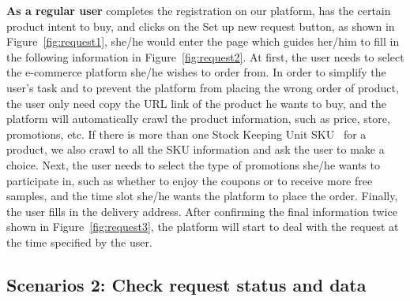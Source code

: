 \textbf{As a regular user} completes the registration on our platform, has the certain product intent to buy, and clicks on the Set up new request button, as shown in Figure~\ref{fig:request1}, she/he would enter the page which guides her/him to fill in the following information in Figure~\ref{fig:request2}. 
At first, the user needs to select the e-commerce platform she/he wishes to order from. In order to simplify the user's task and to prevent the platform from placing the wrong order of product, the user only need copy the URL link of the product he wants to buy, and the platform will automatically crawl the product information, such as price, store, promotions, etc. If there is more than one Stock Keeping Unit SKU~\cite{SKU} for a product, we also crawl to all the SKU information and ask the user to make a choice. 
Next, the user needs to select the type of promotions she/he wants to participate in, such as whether to enjoy the coupons or to receive more free samples, and the time slot she/he wants the platform to place the order. Finally, the user fills in the delivery address. After confirming the final information twice shown in Figure~\ref{fig:request3}, the platform will start to deal with the request at the time specified by the user.

\subsection{Scenarios 2: Check request status and data}

